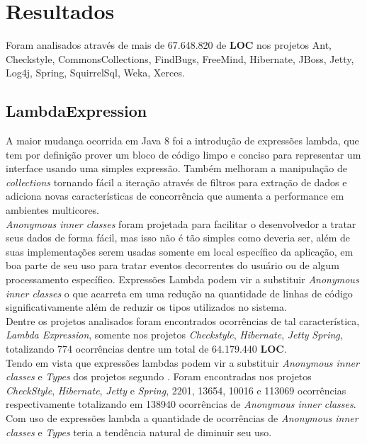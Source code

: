 \chapter {Resultados}
Foram analisados através de mais de 67.648.820 de \textbf{LOC} nos projetos Ant, Checkstyle, CommonsCollections,  FindBugs,  FreeMind,  Hibernate,  JBoss,  Jetty,  Log4j,  Spring,  SquirrelSql,  Weka,  Xerces.\\

\section{LambdaExpression}
A maior mudança ocorrida em Java 8 foi a introdução de expressões lambda, que tem por definição prover um bloco de código limpo e conciso para representar um interface usando uma simples expressão. Também melhoram a manipulação de \textit{collections} tornando fácil a iteração através de filtros para extração de dados e adiciona novas características de concorrência que aumenta a performance em ambientes multicores.\\

\textit{Anonymous inner classes} foram projetada para facilitar o desenvolvedor a tratar seus dados de forma fácil, mas isso não é tão simples como deveria ser, além de suas implementações serem usadas somente em local específico da aplicação, em boa parte de seu uso para tratar eventos decorrentes do usuário ou de algum processamento específico. Expressões Lambda podem vir a substituir \textit{Anonymous inner classes} o que acarreta em uma redução na quantidade de linhas de código significativamente além de reduzir os tipos utilizados no sistema.\\

Dentre os projetos analisados foram encontrados ocorrências de tal característica, \textit{Lambda Expression}, somente nos projetos \textit{Checkstyle}, \textit{Hibernate}, \textit{Jetty} \textit{Spring}, totalizando 774 ocorrências dentre um total de 64.179.440 \textbf{LOC}.\\

Tendo em vista que expressões lambdas podem vir a substituir \textit{Anonymous inner classes} e \textit{Types} dos projetos segundo \cite{Java8Lambda}. Foram encontradas nos projetos \textit{CheckStyle}, \textit{Hibernate}, \textit{Jetty} e \textit{Spring}, 2201, 13654, 10016 e 113069 ocorrências respectivamente totalizando em 138940 ocorrências de \textit{Anonymous inner classes}. Com uso de expressões lambda a quantidade de ocorrências de \textit{Anonymous inner classes} e \textit{Types} teria a tendência natural de diminuir seu uso.\\

